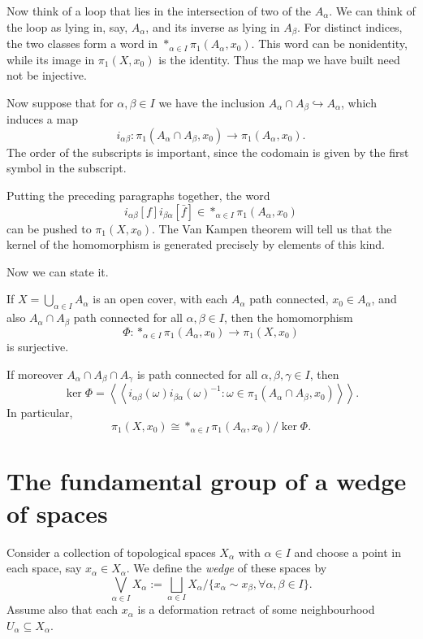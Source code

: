 Now think of a loop that lies in the
intersection of two of
the $A_\alpha$. We can think of the loop as
lying in, say,
$A_\alpha$, and its inverse as lying in
$A_\beta$. For distinct indices, the two
classes form a word in
$\ast_{\alpha\in I}\pi_1(A_\alpha,x_0)$.
This word can be nonidentity, while its
image in $\pi_1(X,x_0)$ is the identity.
Thus the map we have built need not be
injective.

Now suppose that for $\alpha,\beta\in I$ we
have the
inclusion $A_\alpha\cap
A_\beta\hookrightarrow A_\alpha$,
which induces a map
$$
i_{\alpha\beta}:
\pi_1(A_\alpha\cap A_\beta,x_0)
\longrightarrow
\pi_1(A_\alpha,x_0).
$$
The order of the subscripts is important,
since the
codomain is given by the first symbol in the
subscript.

Putting the preceding paragraphs together,
the word
$$
i_{\alpha\beta}[f]i_{\beta\alpha}[\bar f]
\in \ast_{\alpha\in I}
\pi_1(A_\alpha,x_0)
$$
can be pushed to $\pi_1(X,x_0)$. The Van
Kampen theorem will tell us that the kernel
of the homomorphism is generated precisely
by elements of this kind.

Now we can state it.

\begin{theorem}
If $X=\bigcup_{\alpha\in I}A_\alpha$ is an
open cover, with each $A_\alpha$ path
connected, $x_0\in A_\alpha$, and also
$A_\alpha\cap A_\beta$ path connected for all
$\alpha,\beta\in I$, then the homomorphism
$$
\Phi:\ast_{\alpha\in I}\pi_1(A_\alpha,x_0)
\to\pi_1(X,x_0)
$$
is surjective.

If moreover $A_\alpha\cap A_\beta\cap
A_\gamma$ is path
connected for all $\alpha,\beta,\gamma\in I$,
then
$$
\ker\Phi=
\left\langle\left\langle
 i_{\alpha\beta}(\omega)
 i_{\beta\alpha}(\omega)^{-1}
 :\omega\in
 \pi_1(A_\alpha\cap A_\beta,x_0)
\right\rangle\right\rangle.
$$
In particular,
$$
\pi_1(X,x_0)\cong
\ast_{\alpha\in
I}\pi_1(A_\alpha,x_0)/\ker\Phi.
$$
\end{theorem}
\section{The fundamental group of a wedge of
spaces}
\label{section-fundamental-group-wedge}

Consider a collection of topological spaces
$X_\alpha$ with
$\alpha\in I$ and choose a point in each
space, say
$x_\alpha\in X_\alpha$. We define the
\emph{wedge} of these
spaces by
$$
\bigvee_{\alpha\in I}X_\alpha
:=
\bigsqcup_{\alpha\in I}X_\alpha
\Big/\{x_\alpha\sim{}x_\beta,
\forall\alpha,\beta\in
I\}.
$$
Assume also that each $x_\alpha$ is a
deformation retract
of some neighbourhood $U_\alpha\subseteq
X_\alpha$.

